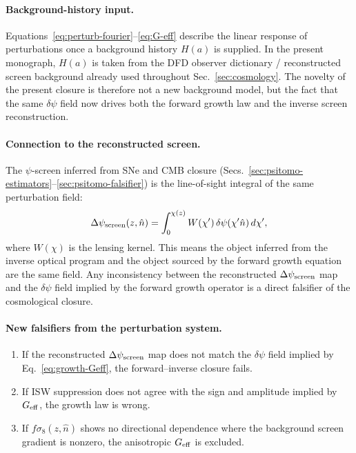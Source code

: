 \paragraph{Background-history input.}
Equations~\eqref{eq:perturb-fourier}--\eqref{eq:G-eff} describe the linear response of perturbations once a background history $H(a)$ is supplied.  In the present monograph, $H(a)$ is taken from the DFD observer dictionary / reconstructed screen background already used throughout Sec.~\ref{sec:cosmology}.  The novelty of the present closure is therefore not a new background model, but the fact that the same $\delta\psi$ field now drives both the forward growth law and the inverse screen reconstruction.

\paragraph{Connection to the reconstructed screen.}
The $\psi$-screen inferred from SNe and CMB closure (Secs.~\ref{sec:psitomo-estimators}--\ref{sec:psitomo-falsifier}) is the line-of-sight integral of the same perturbation field:
\begin{equation}\label{eq:screen-integral}
\Delta\psi_{\rm screen}(z,\hat{n}) = \int_0^{\chi(z)} W(\chi')\,\delta\psi(\chi'\hat{n})\,d\chi',
\end{equation}
where $W(\chi)$ is the lensing kernel.  This means the object inferred from the inverse optical program and the object sourced by the forward growth equation are the same field.  Any inconsistency between the reconstructed $\Delta\psi_{\rm screen}$ map and the $\delta\psi$ field implied by the forward growth operator is a direct falsifier of the cosmological closure.

\paragraph{New falsifiers from the perturbation system.}
\begin{enumerate}
\item If the reconstructed $\Delta\psi_{\rm screen}$ map does not match the $\delta\psi$ field implied by Eq.~\eqref{eq:growth-Geff}, the forward--inverse closure fails.
\item If ISW suppression does not agree with the sign and amplitude implied by $G_{\rm eff}$, the growth law is wrong.
\item If $f\sigma_8(z,\hat{n})$ shows no directional dependence where the background screen gradient is nonzero, the anisotropic $G_{\rm eff}$ is excluded.
\end{enumerate}

